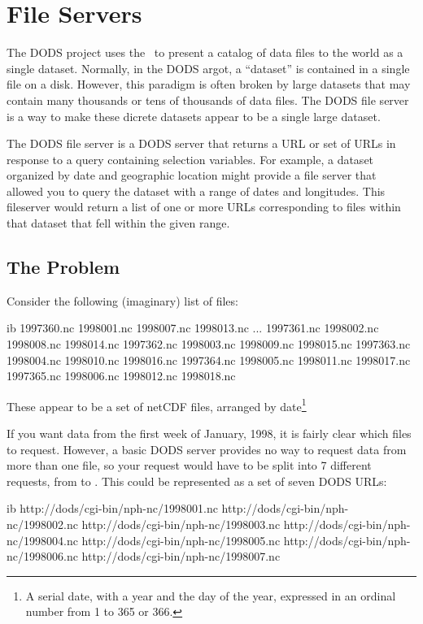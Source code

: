 \chapter{File Servers}
\label{fs}

The DODS project uses the \ffs\ to present a catalog of data files to
the world as a single dataset.  Normally, in the DODS argot, a
``dataset'' is contained in a single file on a disk.  However, this
paradigm is often broken by large datasets that may contain many
thousands or tens of thousands of data files.  The DODS file server is
a way to make these dicrete datasets appear to be a single large
dataset. 

The DODS file server is a DODS server that returns a URL or set of
URLs in response to a query containing selection variables.  For
example, a dataset organized by date and geographic location might
provide a file server that allowed you to query the dataset with a
range of dates and longitudes.  This fileserver would return a list of
one or more URLs corresponding to files within that dataset that fell
within the given range.


\section{The Problem}
\label{fs,problem}

Consider the following (imaginary) list of files:

\begin{vcode}{ib}
1997360.nc  1998001.nc  1998007.nc  1998013.nc ...
1997361.nc  1998002.nc  1998008.nc  1998014.nc
1997362.nc  1998003.nc  1998009.nc  1998015.nc
1997363.nc  1998004.nc  1998010.nc  1998016.nc
1997364.nc  1998005.nc  1998011.nc  1998017.nc
1997365.nc  1998006.nc  1998012.nc  1998018.nc
\end{vcode}

These appear to be a set of netCDF files, arranged by
date\footnote{A serial date, with a year and the day of the
  year, expressed in an ordinal number from 1 to 365 or 366.}

If you want data from the first week of January, 1998, it is fairly
clear which files to request.  However, a basic DODS server provides
no way to request data from more than one file, so your request would
have to be split into 7 different requests, from  to
.  This could be represented as a set of seven DODS
URLs: 

\begin{vcode}{ib}
http://dods/cgi-bin/nph-nc/1998001.nc
http://dods/cgi-bin/nph-nc/1998002.nc
http://dods/cgi-bin/nph-nc/1998003.nc
http://dods/cgi-bin/nph-nc/1998004.nc
http://dods/cgi-bin/nph-nc/1998005.nc
http://dods/cgi-bin/nph-nc/1998006.nc
http://dods/cgi-bin/nph-nc/1998007.nc
\end{vcode}

